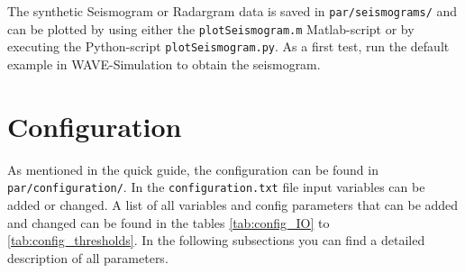 \documentclass[pdftex,a4paper,parskip,listof=totoc,bibliography=totoc,onehalfspacing,12pt]{scrreprt}
\newcommand{\shellcmd}[1]{\indent\indent\texttt{#1}}	%
\begin{document}
The synthetic Seismogram or Radargram data is saved in \shellcmd{par/seismograms/} and can be plotted by using either the \shellcmd{plotSeismogram.m} Matlab-script or by executing the Python-script \shellcmd{plotSeismogram.py}.
As a first test, run the default example in WAVE-Simulation to obtain the seismogram. 


\section{Configuration}
\label{sec:config}
As mentioned in the quick guide, the configuration can be found in \shellcmd{par/configuration/}. In the \shellcmd{configuration.txt} file input variables can be added or changed. A list of all variables and config parameters that can be added and changed can be found in the tables \ref{tab:config_IO} to \ref{tab:config_thresholds}. In the following subsections you can find a detailed description of all parameters.
\end{document}
